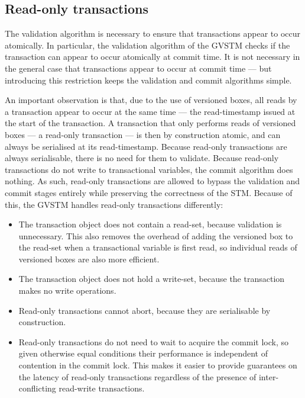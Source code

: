 \documentclass[12pt,a4paper,oneside,openright]{report}
\begin{document}
\subsection{Read-only transactions}
\label{sec:impl:read-only-trans}

The validation algorithm is necessary to ensure that transactions
appear to occur atomically. In particular, the validation algorithm of
the GVSTM checks if the transaction can appear to occur atomically at
commit time. It is not necessary in the general case that transactions
appear to occur at commit time --- but introducing this restriction
keeps the validation and commit algorithms simple.

An important observation is that, due to the use of versioned boxes,
all reads by a transaction appear to occur at the same time --- the
read-timestamp issued at the start of the transaction. A transaction
that only performs reads of versioned boxes --- a read-only
transaction --- is then by construction atomic, and can always be
serialised at its read-timestamp. Because read-only transactions are
always serialisable, there is no need for them to validate. Because
read-only transactions do not write to transactional variables, the
commit algorithm does nothing. As such, read-only transactions are
allowed to bypass the validation and commit stages entirely while
preserving the correctness of the STM. Because of this, the GVSTM
handles read-only transactions differently:

\begin{itemize}
\item The transaction object does not contain a read-set, because
  validation is unnecessary. This also removes the overhead of adding
  the versioned box to the read-set when a transactional variable is
  first read, so individual reads of versioned boxes are also more
  efficient.
\item The transaction object does not hold a write-set, because the
  transaction makes no write operations.
\item Read-only transactions cannot abort, because they are
  serialisable by construction.
\item Read-only transactions do not need to wait to acquire the commit
  lock, so given otherwise equal conditions their performance is
  independent of contention in the commit lock. This makes it easier
  to provide guarantees on the latency of read-only transactions
  regardless of the presence of inter-conflicting read-write
  transactions.
\end{itemize}
\end{document}
